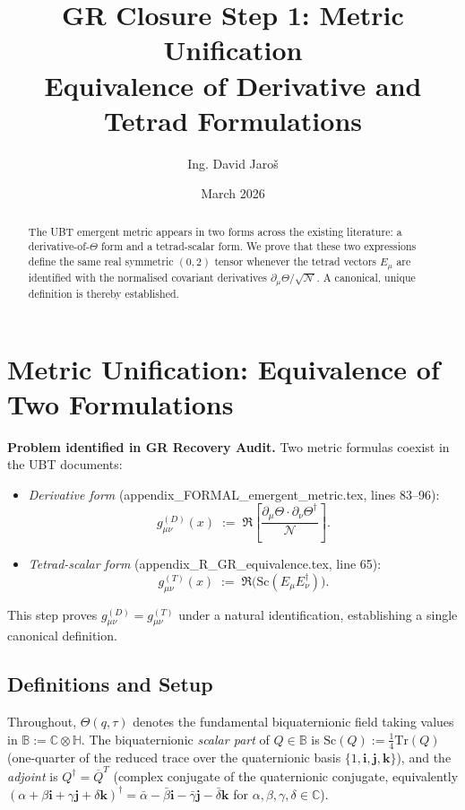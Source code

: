 \documentclass[12pt]{article}
\title{\textbf{GR Closure Step 1: Metric Unification\\
         Equivalence of Derivative and Tetrad Formulations}}
\author{Ing. David Jaroš}
\date{March 2026}
\theoremstyle{definition}
\theoremstyle{remark}
\begin{document}
  \maketitle

  \begin{abstract}
  The UBT emergent metric appears in two forms across the existing literature:
  a derivative-of-$\Theta$ form and a tetrad-scalar form. We prove that these
  two expressions define the same real symmetric $(0,2)$ tensor whenever the
  tetrad vectors $E_\mu$ are identified with the normalised covariant
  derivatives $\partial_\mu\Theta / \sqrt{\mathcal{N}}$. A canonical, unique
  definition is thereby established.
  \end{abstract}
\fi

\section{Metric Unification: Equivalence of Two Formulations}
\label{sec:metric_unification}

\begin{tcolorbox}[colback=blue!5!white,colframe=blue!75!black,title=Purpose of This Step]
\textbf{Problem identified in GR Recovery Audit.}
Two metric formulas coexist in the UBT documents:
\begin{itemize}
  \item \emph{Derivative form} (appendix\_FORMAL\_emergent\_metric.tex, lines 83--96):
        \[
          g_{\mu\nu}^{(D)}(x) \;:=\; \Re\!\left[\frac{\partial_\mu\Theta\cdot\partial_\nu\Theta^\dagger}{\mathcal{N}}\right].
        \]
  \item \emph{Tetrad-scalar form} (appendix\_R\_GR\_equivalence.tex, line 65):
        \[
          g_{\mu\nu}^{(T)}(x) \;:=\; \Re\!\bigl(\mathrm{Sc}(E_\mu E_\nu^\dagger)\bigr).
        \]
\end{itemize}
This step proves $g_{\mu\nu}^{(D)} = g_{\mu\nu}^{(T)}$ under a natural identification,
establishing a single canonical definition.
\end{tcolorbox}

\subsection{Definitions and Setup}

Throughout, $\Theta(q,\tau)$ denotes the fundamental biquaternionic field taking
values in $\mathbb{B} := \mathbb{C}\otimes\mathbb{H}$.  The biquaternionic
\emph{scalar part} of $Q\in\mathbb{B}$ is $\mathrm{Sc}(Q) :=\tfrac{1}{4}\mathrm{Tr}(Q)$
(one-quarter of the reduced trace over the quaternionic basis $\{1,\mathbf{i},\mathbf{j},\mathbf{k}\}$),
and the \emph{adjoint} is $Q^\dagger = \overline{Q}^T$ (complex conjugate of the quaternionic
conjugate, equivalently $(\alpha + \beta\mathbf{i}+\gamma\mathbf{j}+\delta\mathbf{k})^\dagger
= \bar\alpha - \bar\beta\mathbf{i} - \bar\gamma\mathbf{j} - \bar\delta\mathbf{k}$ for
$\alpha,\beta,\gamma,\delta\in\mathbb{C}$).
\end{document}
